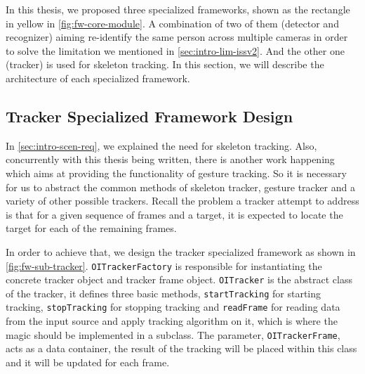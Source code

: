 %

In this thesis, we proposed three specialized frameworks, shown as the
rectangle in yellow in \autoref{fig:fw-core-module}. A combination of two
of them (detector and recognizer) aiming re-identify the same person across
multiple cameras in order to solve the limitation we mentioned in
\autoref{sec:intro-lim-issv2}.
And the other one (tracker) is used for skeleton tracking.
In this section, we will describe the architecture of each specialized
framework.

\subsection{Tracker Specialized Framework Design}
\label{sec:fw-design-spec-tracker}

In \autoref{sec:intro-scen-req}, we explained the need for skeleton tracking.
Also, concurrently with this thesis being written, there is another work
happening which aims at providing the functionality of gesture tracking. So it
is necessary for us to abstract the common methods of skeleton tracker, gesture
tracker and a variety of other possible trackers.
Recall the problem a tracker attempt to address is that for a given sequence of
frames and a target, it is expected to locate the target for each of the
remaining frames.

In order to achieve that, we design the tracker specialized framework as shown in
\autoref{fig:fw-sub-tracker}. \texttt{OITrackerFactory} is responsible for
instantiating the concrete tracker object and tracker frame object.
\texttt{OITracker} is the abstract class of the tracker, it defines three basic
methods, \texttt{startTracking} for starting tracking, \texttt{stopTracking}
for stopping tracking and \texttt{readFrame} for reading data from the input
source and apply tracking algorithm on it, which is where the magic should be
implemented in a subclass. The parameter, \texttt{OITrackerFrame}, acts as a
data container, the result of the tracking will be placed within this class and
it will be updated for each frame.


